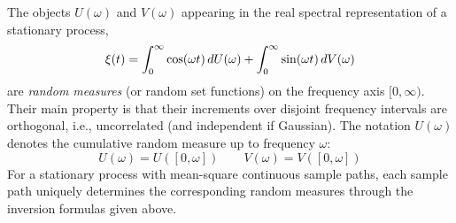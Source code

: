 \documentclass{article}
\newcommand{\tmem}[1]{{\em #1\/}}
\begin{document}
\begin{remark}
  The objects $U (\omega)$ and $V (\omega)$ appearing in the real spectral
  representation of a stationary process,
  \begin{equation}
    \xi (t) = \int_0^{\infty} \cos (\omega t)  \hspace{0.17em} dU (\omega) +
    \int_0^{\infty} \sin (\omega t)  \hspace{0.17em} dV (\omega)
  \end{equation}
  are {\tmem{random measures}} (or random set functions) on the frequency axis
  $[0, \infty)$. Their main property is that their increments over disjoint
  frequency intervals are orthogonal, i.e., uncorrelated (and independent if
  Gaussian). The notation $U (\omega)$ denotes the cumulative random measure
  up to frequency $\omega$:
  \begin{equation}
    U (\omega) = U ([0, \omega])  \qquad V (\omega) = V ([0, \omega])
  \end{equation}
  For a stationary process with mean-square continuous sample paths, each
  sample path uniquely determines the corresponding random measures through
  the inversion formulas given above.
\end{remark}
\end{document}

